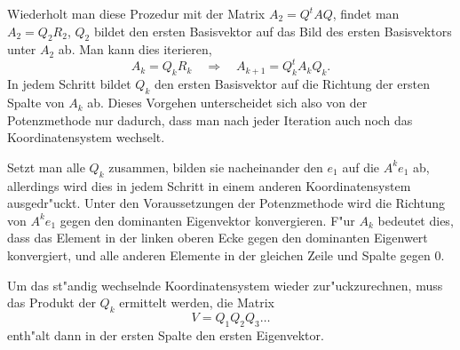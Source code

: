 Wiederholt man diese Prozedur mit
der Matrix $A_2=Q^tAQ$, findet man $A_2=Q_2R_2$, 
$Q_2$  bildet den ersten Basisvektor auf das Bild  des ersten
Basisvektors unter $A_2$ ab.
Man kann dies iterieren,
\[
A_k=Q_kR_k\quad\Rightarrow\quad
A_{k+1}=Q_k^tA_kQ_k.
\]
In jedem Schritt bildet $Q_k$ den ersten Basisvektor auf die Richtung
der ersten Spalte von $A_k$ ab.
Dieses Vorgehen unterscheidet sich
also von der Potenzmethode nur dadurch, dass man nach jeder Iteration
auch noch das Koordinatensystem wechselt.

Setzt man alle $Q_k$ zusammen, bilden
sie nacheinander den $e_1$ auf die $A^ke_1$ ab, allerdings wird
dies in jedem Schritt in einem anderen Koordinatensystem ausgedr"uckt.
Unter den Voraussetzungen der Potenzmethode wird die Richtung von
$A^ke_1$ gegen den dominanten Eigenvektor konvergieren.
F"ur $A_k$ bedeutet dies,
dass das Element in der linken oberen Ecke gegen den dominanten Eigenwert
konvergiert, und alle anderen Elemente in der gleichen Zeile und Spalte
gegen $0$.

Um das st"andig wechselnde Koordinatensystem wieder zur"uckzurechnen,
muss das Produkt der $Q_k$ ermittelt werden,  die Matrix
\[
V=Q_1Q_2Q_3\dots
\]
enth"alt dann in der ersten Spalte den ersten Eigenvektor.

